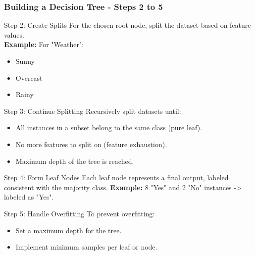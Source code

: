 \documentclass[aspectratio=169]{beamer}
\begin{document}
\begin{frame}[fragile]
    \frametitle{Building a Decision Tree - Steps 2 to 5}
    \begin{block}{Step 2: Create Splits}
        For the chosen root node, split the dataset based on feature values. \\
        \textbf{Example:} For "Weather":
        \begin{itemize}
            \item Sunny
            \item Overcast
            \item Rainy
        \end{itemize}
    \end{block}
    
    \begin{block}{Step 3: Continue Splitting}
        Recursively split datasets until:
        \begin{itemize}
            \item All instances in a subset belong to the same class (pure leaf).
            \item No more features to split on (feature exhaustion).
            \item Maximum depth of the tree is reached.
        \end{itemize}
    \end{block}

    \begin{block}{Step 4: Form Leaf Nodes}
        Each leaf node represents a final output, labeled consistent with the majority class.
        \textbf{Example:} 8 "Yes" and 2 "No" instances -> labeled as "Yes".
    \end{block}

    \begin{block}{Step 5: Handle Overfitting}
        To prevent overfitting:
        \begin{itemize}
            \item Set a maximum depth for the tree.
            \item Implement minimum samples per leaf or node.
        \end{itemize}
    \end{block}
\end{frame}
\end{document}
